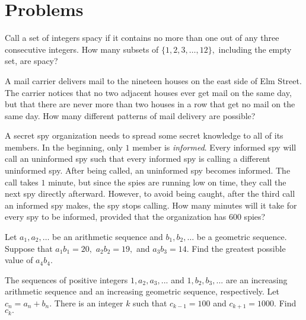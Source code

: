 \documentclass[mast]{lucky}
\begin{document}
\pagebreak

\section{Problems}
    
\begin{prob}[AMC 12A 2007/25]{2}
Call a set of integers spacy if it contains no more than one out of any three consecutive integers. How many subsets of $\{1,2,3,\ldots,12\},$ including the empty set, are spacy?
\end{prob}

\begin{prob}[AIME I 2001/14]{2}
A mail carrier delivers mail to the nineteen houses on the east side of Elm Street. The carrier notices that no two adjacent houses ever get mail on the same day, but that there are never more than two houses in a row that get no mail on the same day. How many different patterns of mail delivery are possible?
\end{prob}

\begin{prob}{3}
A secret spy organization needs to spread some secret knowledge to all of its members. In the beginning, only $1$ member is \textit{informed}. Every informed spy will call an uninformed spy such that every informed spy is calling a different uninformed spy. After being called, an uninformed spy becomes informed. The call takes $1$ minute, but since the spies are running low on time, they call the next spy directly afterward. However, to avoid being caught, after the third call an informed spy makes, the spy stops calling. How many minutes will it take for every spy to be informed, provided that the organization has $600$ spies?
\end{prob}

\begin{prob}[HMMT 2019]{3}
Let $a_1,a_2,\dots$ be an arithmetic sequence and $b_1,b_2,\dots$ be a geometric sequence. Suppose that $a_1b_1=20,$ $a_2b_2=19,$ and $a_3b_3=14.$ Find the greatest possible value of $a_4b_4.$
\end{prob}

\begin{prob}[AIME II 2016/9]{3}
The sequences of positive integers $1,a_2, a_3,...$ and $1,b_2, b_3,...$ are an increasing arithmetic sequence and an increasing geometric sequence, respectively. Let $c_n=a_n+b_n$. There is an integer $k$ such that $c_{k-1}=100$ and $c_{k+1}=1000$. Find $c_k.$
\end{prob}
\end{document}
